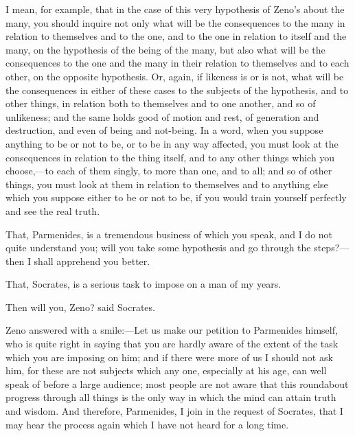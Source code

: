 \documentclass[11pt,letter]{article}
\begin{document}
\par  I mean, for example, that in the case of this very hypothesis of Zeno's about the many, you should inquire not only what will be the consequences to the many in relation to themselves and to the one, and to the one in relation to itself and the many, on the hypothesis of the being of the many, but also what will be the consequences to the one and the many in their relation to themselves and to each other, on the opposite hypothesis. Or, again, if likeness is or is not, what will be the consequences in either of these cases to the subjects of the hypothesis, and to other things, in relation both to themselves and to one another, and so of unlikeness; and the same holds good of motion and rest, of generation and destruction, and even of being and not-being. In a word, when you suppose anything to be or not to be, or to be in any way affected, you must look at the consequences in relation to the thing itself, and to any other things which you choose,—to each of them singly, to more than one, and to all; and so of other things, you must look at them in relation to themselves and to anything else which you suppose either to be or not to be, if you would train yourself perfectly and see the real truth.

\par  That, Parmenides, is a tremendous business of which you speak, and I do not quite understand you; will you take some hypothesis and go through the steps?—then I shall apprehend you better.

\par  That, Socrates, is a serious task to impose on a man of my years.

\par  Then will you, Zeno? said Socrates.

\par  Zeno answered with a smile:—Let us make our petition to Parmenides himself, who is quite right in saying that you are hardly aware of the extent of the task which you are imposing on him; and if there were more of us I should not ask him, for these are not subjects which any one, especially at his age, can well speak of before a large audience; most people are not aware that this roundabout progress through all things is the only way in which the mind can attain truth and wisdom. And therefore, Parmenides, I join in the request of Socrates, that I may hear the process again which I have not heard for a long time.
\end{document}
